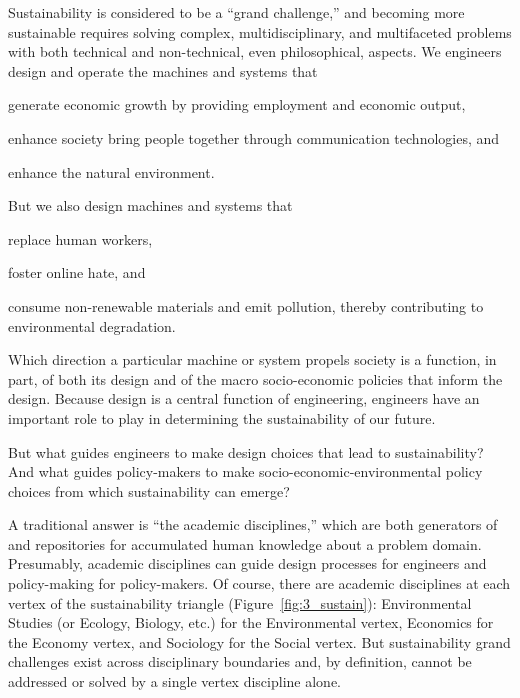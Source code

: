 \documentclass[12pt]{article}
\begin{document}
Sustainability is considered to be a ``grand challenge,'' 
and becoming more sustainable requires solving 
complex, multidisciplinary, and multifaceted problems
with both technical and non-technical, even philosophical, aspects. 
We engineers design and operate the machines and systems that
%
\begin{enumerate*}[label={(\alph*)}]

  \item generate economic growth by providing employment and economic output, 

  \item enhance society bring people together through communication technologies, and
        
  \item enhance the natural environment.

\end{enumerate*}
%
But we also design machines and systems that
%
\begin{enumerate*}[label={(\alph*)}]

  \item replace human workers,

  \item foster online hate, and
        
  \item consume non-renewable materials and
        emit pollution, thereby contributing to environmental degradation.

\end{enumerate*}
%
Which direction a particular machine or system propels society is a function, in part,
of both its design and of the macro socio-economic policies that inform the design.
Because design is a central function of engineering, 
engineers have an important role to play in determining 
the sustainability of our future. 

But what guides engineers to make design choices that lead to sustainability?
And what guides policy-makers to make socio-economic-environmental
policy choices from which sustainability can emerge?

A traditional answer is ``the academic disciplines,'' 
which are both generators of and repositories for accumulated human knowledge
about a problem domain.
Presumably, academic disciplines can guide design processes for engineers
and policy-making for policy-makers.
Of course, there are academic disciplines 
at each vertex of the sustainability triangle (Figure~\ref{fig:3_sustain}):
Environmental Studies (or Ecology, Biology, etc.) for the Environmental vertex, 
Economics for the Economy vertex, and 
Sociology for the Social vertex.
But sustainability grand challenges exist across disciplinary boundaries and, by definition,
cannot be addressed or solved by a single vertex discipline alone.
\end{document}
